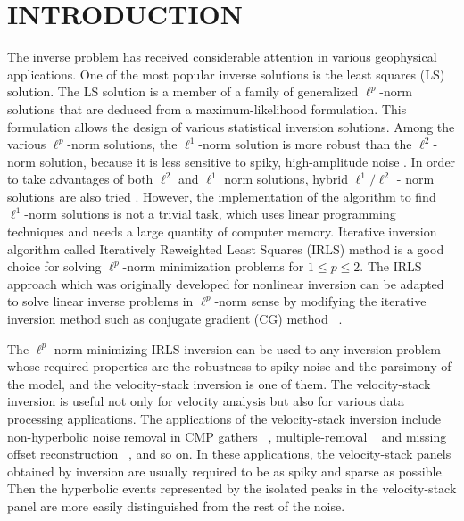 \section{INTRODUCTION}

The inverse problem has received considerable attention 
in various geophysical applications. 
One of the most popular inverse solutions is the least squares (LS) solution.
The LS solution is a member of a family of generalized 
$\ell^p$-norm solutions that are deduced from a maximum-likelihood formulation.
This formulation allows the design of various statistical inversion solutions.  
Among the various $\ell^p$-norm solutions, 
the $\ell^1$-norm solution is more robust than the $\ell^2$-norm solution, 
because it is less sensitive to spiky, high-amplitude noise 
\cite{GEO38-05-08260844,GEO44-01-00390052,GIT00-00-00250050,SEG-1988-S7.1}.
In order to take advantages of both $\ell^2$ and $\ell^1$ norm solutions, 
hybrid $\ell^1/\ell^2$ - norm solutions are also 
tried \cite{Huber:73,GEO62-04-11831195,GEO68-04-13101319}.
However, the implementation of the algorithm to find
$\ell^1$-norm solutions is not a trivial task, which uses linear programming techniques 
\cite{GEO44-01-00390052} and needs a large quantity of computer memory.
Iterative inversion algorithm called Iteratively Reweighted Least Squares (IRLS) method
\cite{GEO51-02-03570368,GIT00-00-00250050,SEG-1988-S7.1,GEO62-04-11831195} 
is a good choice for solving
$\ell^p$-norm minimization problems for $1\le p \le2$.  
The IRLS approach which was originally developed for nonlinear inversion
can be adapted to solve linear inverse problems in $\ell^p$-norm sense
by modifying the iterative inversion method such as conjugate gradient (CG) method
~\cite{Darche.sep.61.281,Nichols.sep.82.1,Claerbout.iee.www}.

The $\ell^p$-norm minimizing IRLS inversion can be used to any inversion problem 
whose required properties are the robustness to spiky noise and the parsimony of the model,
and the velocity-stack inversion is one of them.
The velocity-stack inversion is useful not only for velocity analysis 
but also for various data processing applications.
The applications of the velocity-stack inversion include
non-hyperbolic noise removal in CMP gathers ~\cite{Nichols.sep.82.1,GEO68-04-13101319}, 
multiple-removal 
~\cite{GEO50-12-27272741,Hampson-22-044055,GEO57-03-03860395,SEG-1995-1464,SEG-1995-1460,TLE18-01-00660073,SEG-2000-19531956}
and missing offset reconstruction ~\cite{Ji.sep.82.195,GEO60-04-11691177},
and so on.
In these applications, the velocity-stack panels obtained 
by inversion are usually required
to be as spiky and sparse as possible.
Then the hyperbolic events represented by the isolated peaks 
in the velocity-stack panel
are more easily distinguished from the rest of the noise.

